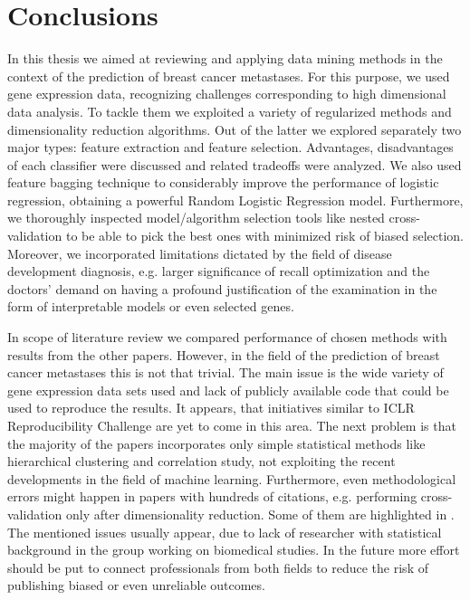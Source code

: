 \documentclass[shortabstract, english, mgr]{iithesis}
\begin{document}
\chapter{Conclusions} \label{section:summary}

In this thesis we aimed at reviewing and applying data mining methods in the context of the prediction of breast cancer metastases. For this purpose, we used gene expression data, recognizing challenges corresponding to high dimensional data analysis. To tackle them we exploited a variety of regularized methods and dimensionality reduction algorithms. Out of the latter we explored separately two major types: feature extraction and feature selection. Advantages, disadvantages of each classifier were discussed and related tradeoffs were analyzed. We also used feature bagging technique to considerably improve the performance of logistic regression, obtaining a powerful Random Logistic Regression model. Furthermore, we thoroughly inspected model/algorithm selection tools like nested cross-validation to be able to pick the best ones with minimized risk of biased selection. Moreover, we incorporated limitations dictated by the field of disease development diagnosis, e.g. larger significance of recall optimization and the doctors' demand on having a profound justification of the examination in the form of interpretable models or even selected genes. 

In scope of literature review we compared performance of chosen methods with results from the other papers. However, in the field of the prediction of breast cancer metastases this is not that trivial. The main issue is the wide variety of gene expression data sets used and lack of publicly available code that could be used to reproduce the results. It appears, that initiatives similar to ICLR Reproducibility Challenge are yet to come in this area. The next problem is that the majority of the papers incorporates only simple statistical methods like hierarchical clustering and correlation study, not exploiting the recent developments in the field of machine learning. Furthermore, even methodological errors might happen in papers with hundreds of citations, e.g. performing cross-validation only after dimensionality reduction. Some of them are highlighted in \cite{dimRedInCV}. The mentioned issues usually appear, due to lack of researcher with statistical background in the group working on biomedical studies. In the future more effort should be put to connect professionals from both fields to reduce the risk of publishing biased or even unreliable outcomes. 
\end{document}

